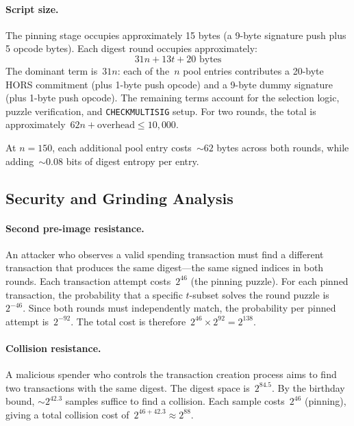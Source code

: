 \documentclass[11pt, a4paper]{article}
\begin{document}
\paragraph{Script size.}
The pinning stage occupies approximately 15 bytes (a 9-byte signature push plus 5 opcode bytes). Each digest round occupies approximately:
$$31n + 13 t + 20 \text{ bytes}$$
The dominant term is~$31n$: each of the~$n$ pool entries contributes a 20-byte HORS commitment (plus 1-byte push opcode) and a 9-byte dummy signature (plus 1-byte push opcode). The remaining terms account for the selection logic, puzzle verification, and \texttt{CHECKMULTISIG} setup. For two rounds, the total is approximately~$62n + \text{overhead} \leq 10{,}000$.

At $n = 150$, each additional pool entry costs~${\sim}62$ bytes across both rounds, while adding~${\sim}0.08$ bits of digest entropy per entry.

\subsection{Security and Grinding Analysis}
\label{sec:security-detail}

\paragraph{Second pre-image resistance.}
An attacker who observes a valid spending transaction must find a different transaction that produces the same digest---the same signed indices in both rounds. Each transaction attempt costs~$2^{46}$ (the pinning puzzle). For each pinned transaction, the probability that a specific $t$-subset solves the round puzzle is~$2^{-46}$. Since both rounds must independently match, the probability per pinned attempt is~$2^{-92}$. The total cost is therefore~$2^{46} \times 2^{92} = 2^{138}$.

\paragraph{Collision resistance.}
A malicious spender who controls the transaction creation process aims to find two transactions with the same digest. The digest space is~$2^{84.5}$. By the birthday bound, ${\sim}2^{42.3}$ samples suffice to find a collision. Each sample costs~$2^{46}$ (pinning), giving a total collision cost of~$2^{46 + 42.3} \approx 2^{88}$.
\end{document}
